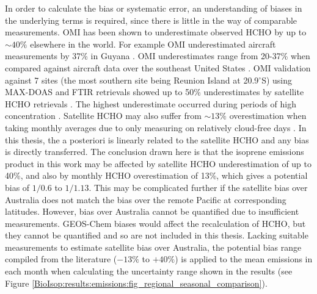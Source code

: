 \documentclass[acp, manuscript]{copernicus}
\newcommand{\parencite}{\citep}
\newcommand{\degr}{$^{\circ}$}
\begin{document}
    In order to calculate the bias or systematic error, an understanding of biases in the underlying terms is required, since there is little in the way of comparable measurements.
    OMI has been shown to underestimate observed HCHO by up to $\sim40\%$ elsewhere in the world.
    For example OMI underestimated aircraft measurements by 37\% in Guyana \parencite{Barkley2013}.
    OMI underestimates range from 20-37\% when compared against aircraft data over the southeast United States \parencite{Zhu2016}.
    OMI validation against 7 sites (the most southern site being Reunion Island at 20.9\degr S) using MAX-DOAS and FTIR retrievals showed up to 50\% underestimates by satellite HCHO retrievals \parencite{DeSmedt2015}.
    The highest underestimate occurred during periods of high concentration 
    \parencite{Vigouroux2009,DeSmedt2015}.
    Satellite HCHO may also suffer from $\sim{13}\%$ overestimation when taking monthly averages due to only measuring on relatively cloud-free days \parencite{Surl2018}.
    In this thesis, the a posteriori is linearly related to the satellite HCHO and any bias is directly transferred.
    The conclusion drawn here is that the isoprene emissions product in this work may be affected by satellite HCHO underestimation of up to 40\%, and also by monthly HCHO overestimation of 13\%, which gives a potential bias of $1/0.6$ to $1/1.13$.
    This may be complicated further if the satellite bias over Australia does not match the bias over the remote Pacific at corresponding latitudes.
    However, bias over Australia cannot be quantified due to insufficient measurements.
    GEOS-Chem biases would affect the recalculation of HCHO, but they cannot be quantified and so are not included in this thesis.
    Lacking suitable measurements to estimate satellite bias over Australia, the potential bias range compiled from the literature ($-13\%$ to $+40\%$) is applied to the mean emissions in each month when calculating the uncertainty range shown in the results (see Figure \ref{BioIsop:results:emissions:fig_regional_seasonal_comparison}).
    
      
      
\end{document}
